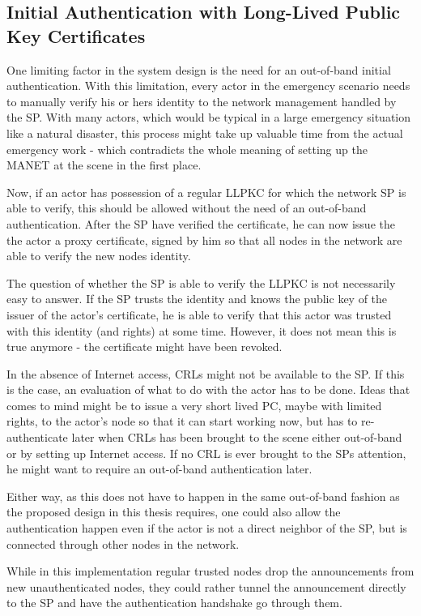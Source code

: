 \subsection{Initial Authentication with Long-Lived Public Key Certificates}
One limiting factor in the system design is the need for an out-of-band
initial authentication. With this limitation, every actor in the emergency
scenario needs to manually verify his or hers identity to the network management
handled by the \ac{SP}. With many actors, which would be typical in a large
emergency situation like a natural disaster, this process might take up valuable
time from the actual emergency work - which contradicts the whole meaning of
setting up the \ac{MANET} at the scene in the first place.

Now, if an actor has possession of a regular \ac{LLPKC} for which the network
\ac{SP} is able to verify, this should be allowed without the need of an
out-of-band authentication. After the \ac{SP} have verified the certificate, he
can now issue the the actor a proxy certificate, signed by him so that all nodes
in the network are able to verify the new nodes identity.

The question of whether the \ac{SP} is able to verify the \ac{LLPKC} is not
necessarily easy to answer. If the \ac{SP} trusts the identity and knows the
public key of the issuer of the actor's certificate, he is able to verify that
this actor was trusted with this identity (and rights) at some time. However, it
does not mean this is true anymore - the certificate might have been revoked.

In the absence of Internet access, \acp{CRL} might not be available to the
\ac{SP}. If this is the case, an evaluation of what to do with the actor has to
be done. Ideas that comes to mind might be to issue a very short lived \ac{PC},
maybe with limited rights, to the actor's node so that it can start working now,
but has to re-authenticate later when \acp{CRL} has been brought to the scene
either out-of-band or by setting up Internet access. If no \ac{CRL} is ever
brought to the SPs attention, he might want to require an out-of-band
authentication later.

Either way, as this does not have to happen in the same out-of-band fashion as
the proposed design in this thesis requires, one could also allow the
authentication happen even if the actor is not a direct neighbor of the \ac{SP},
but is connected through other nodes in the network.

While in this implementation regular trusted nodes drop the announcements from
new unauthenticated nodes, they could rather tunnel the announcement directly to
the \ac{SP} and have the authentication handshake go through them.

